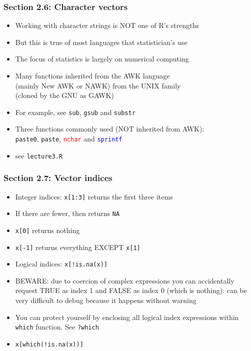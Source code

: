 \documentclass[11pt,pdftex,dvipsnames,usenames,helvetica]{beamer}
\begin{document}
\begin{frame}
\frametitle{Section 2.6: Character vectors}

\begin{itemize}
\item Working with character strings is NOT one of R's strengths
\item But this is true of most languages that statistician's use
\item The focus of statistics is largely on numerical computing
\item Many functions inherited from the AWK language\\
(mainly New AWK or NAWK) from the UNIX family\\
(cloned by the GNU as GAWK)
\item For example, see {\tt sub}, {\tt gsub} and {\tt substr}
\item Three functions commonly used (NOT inherited from AWK):\\ 
{\tt paste0}, {\tt paste}, \textcolor{red}{\tt nchar}
and \textcolor{blue}{\tt sprintf}
\item see {\tt lecture3.R}
\end{itemize}

\end{frame}

\begin{frame}
\frametitle{Section 2.7: Vector indices}

\begin{itemize}
\item Integer indices: {\tt x[1:3]} returns the first three items
\item If there are fewer, then returns {\tt NA}
\item {\tt x[0]} returns nothing
\item {\tt x[-1]} returns everything EXCEPT {\tt x[1]} 
\item Logical indices: {\tt x[!is.na(x)]}
\item BEWARE: due to coercion of complex expressions you can
  accidentally request TRUE as index 1 and FALSE as index 0 
(which is nothing): can be very difficult to debug because
it happens without warning
\item You can protect yourself by enclosing all logical index
expressions within {\tt which} function. See {\tt ?which}
\item {\tt x[which(!is.na(x))]}
\end{itemize}

\end{frame}
\end{document}

